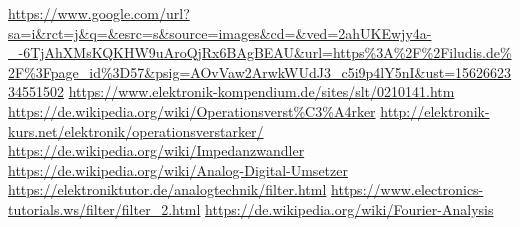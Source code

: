 \begin{thebibliography}{xxx}
		\url{https://www.google.com/url?sa=i&rct=j&q=&esrc=s&source=images&cd=&ved=2ahUKEwjy4a-_-6TjAhXMsKQKHW9uAroQjRx6BAgBEAU&url=https%3A%2F%2Filudis.de%2F%3Fpage_id%3D57&psig=AOvVaw2ArwkWUdJ3_c5i9p4lY5nI&ust=1562662334551502}
		\url{https://www.elektronik-kompendium.de/sites/slt/0210141.htm}
		\url{https://de.wikipedia.org/wiki/Operationsverst%C3%A4rker}
		\url{http://elektronik-kurs.net/elektronik/operationsverstarker/}
		\url{https://de.wikipedia.org/wiki/Impedanzwandler}
		\url{https://de.wikipedia.org/wiki/Analog-Digital-Umsetzer}
		\url{https://elektroniktutor.de/analogtechnik/filter.html}
		\url{https://www.electronics-tutorials.ws/filter/filter_2.html}
		\url{https://de.wikipedia.org/wiki/Fourier-Analysis}
\end{thebibliography}
 